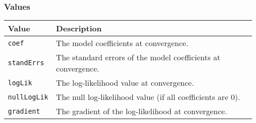 \documentclass[article]{jss}
\begin{document}
\hypertarget{values}{%
\subsubsection{Values}\label{values}}

\begin{longtable}[]{@{}ll@{}}
\toprule
\begin{minipage}[b]{0.21\columnwidth}\raggedright
Value\strut
\end{minipage} & \begin{minipage}[b]{0.73\columnwidth}\raggedright
Description\strut
\end{minipage}\tabularnewline
\midrule
\endhead
\begin{minipage}[t]{0.21\columnwidth}\raggedright
\texttt{coef}\strut
\end{minipage} & \begin{minipage}[t]{0.73\columnwidth}\raggedright
The model coefficients at convergence.\strut
\end{minipage}\tabularnewline
\begin{minipage}[t]{0.21\columnwidth}\raggedright
\texttt{standErrs}\strut
\end{minipage} & \begin{minipage}[t]{0.73\columnwidth}\raggedright
The standard errors of the model coefficients at convergence.\strut
\end{minipage}\tabularnewline
\begin{minipage}[t]{0.21\columnwidth}\raggedright
\texttt{logLik}\strut
\end{minipage} & \begin{minipage}[t]{0.73\columnwidth}\raggedright
The log-likelihood value at convergence.\strut
\end{minipage}\tabularnewline
\begin{minipage}[t]{0.21\columnwidth}\raggedright
\texttt{nullLogLik}\strut
\end{minipage} & \begin{minipage}[t]{0.73\columnwidth}\raggedright
The null log-likelihood value (if all coefficients are 0).\strut
\end{minipage}\tabularnewline
\begin{minipage}[t]{0.21\columnwidth}\raggedright
\texttt{gradient}\strut
\end{minipage} & \begin{minipage}[t]{0.73\columnwidth}\raggedright
The gradient of the log-likelihood at convergence.\strut
\end{minipage}\tabularnewline

\end{longtable}
\end{document}
